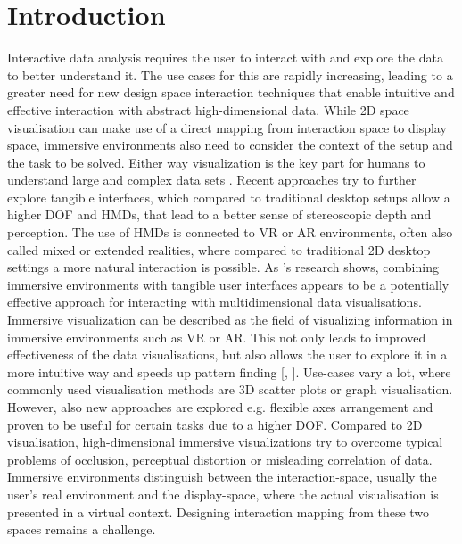 

\section{Introduction}
\label{section:Introduction}
Interactive data analysis requires the user to interact with and explore the data to better understand it. The use cases for this are rapidly increasing, leading to a greater need for new design space interaction techniques that enable intuitive and effective interaction with abstract high-dimensional data. While 2D space visualisation can make use of a direct mapping from interaction space to display space, immersive environments also need to consider the context of the setup and the task to be solved. Either way visualization is the key part for humans to understand large and complex data sets \autocite[]{Donalek2015}. \newline
Recent approaches try to further explore tangible interfaces, which compared to traditional desktop setups allow a higher \ac{DOF} \autocite{Bach2018} \autocite[]{Besancon2017} and \ac{HMD}s, that lead to a better sense of stereoscopic depth and perception. The use of \ac{HMD}s is connected to \ac{VR} or \ac{AR} environments, often also called mixed or extended realities, where compared to traditional 2D desktop settings a more natural interaction is possible. As \cite{Bach2018}'s research shows, combining immersive environments with tangible user interfaces appears to be a potentially effective approach for interacting with multidimensional data visualisations.\newline
Immersive visualization can be described as the field of visualizing information in immersive environments such as \ac{VR} or \ac{AR}. This not only leads to improved effectiveness of the data visualisations, but also allows the user to explore it in a more intuitive way and speeds up pattern finding [\autocite[3]{Butscher2018}, \autocite[489]{WagnerFilho2018}]. Use-cases vary a lot, where commonly used visualisation methods are 3D scatter plots or graph visualisation. However, also new approaches are explored e.g. flexible axes arrangement \autocite[]{Cordeil2017a} and proven to be useful for certain tasks due to a higher \ac{DOF}.\newline
Compared to 2D visualisation, high-dimensional immersive visualizations try to overcome typical problems of occlusion, perceptual distortion or misleading correlation of data. Immersive environments distinguish between the interaction-space, usually the user's real environment and the display-space, where the actual visualisation is presented in a virtual context. Designing interaction mapping from these two spaces remains a challenge.\newline
